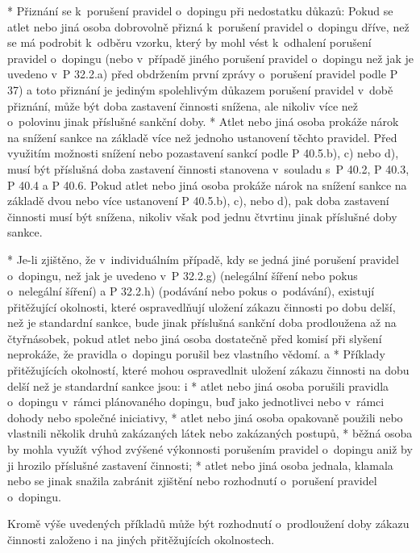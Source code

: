   * Přiznání se k~porušení pravidel o~dopingu při nedostatku důkazů: Pokud se atlet nebo jiná osoba dobrovolně přizná k~porušení pravidel o~dopingu dříve, než se má podrobit k~odběru vzorku, který by mohl vést k~odhalení porušení pravidel o~dopingu (nebo v~případě jiného porušení pravidel o~dopingu než jak je uvedeno v~P 32.2.a) před obdržením první zprávy o~porušení pravidel podle P 37) a toto přiznání je jediným spolehlivým důkazem porušení pravidel v~době přiznání, může být doba zastavení činnosti snížena, ale nikoliv více než o~polovinu jinak příslušné sankční doby.
  * Atlet nebo jiná osoba prokáže nárok na snížení sankce na základě více než jednoho ustanovení těchto pravidel. Před využitím možnosti snížení nebo pozastavení sankcí podle P 40.5.b), c) nebo d),  musí být příslušná doba zastavení činnosti stanovena v~souladu s~P 40.2, P 40.3, P 40.4 a P 40.6. Pokud atlet nebo jiná osoba prokáže nárok na snížení sankce na základě dvou nebo více ustanovení P 40.5.b), c), nebo d), pak doba zastavení činnosti musí být snížena, nikoliv však pod jednu čtvrtinu jinak příslušné doby sankce.
  \enditems

* Je-li zjištěno, že v~individuálním případě, kdy se jedná jiné porušení pravidel o~dopingu, než jak je uvedeno v~P 32.2.g) (nelegální šíření nebo pokus o~nelegální šíření) a P 32.2.h) (podávání nebo pokus o~podávání), existují přitěžující okolnosti, které ospravedlňují uložení zákazu činnosti po dobu delší, než je standardní sankce, bude jinak příslušná sankční doba prodloužena až na čtyřnásobek, pokud atlet nebo jiná osoba dostatečně před komisí při slyšení neprokáže, že pravidla o~dopingu porušil bez vlastního vědomí.
  \begitems \style a
  * Příklady přitěžujících okolností, které mohou ospravedlnit uložení zákazu činnosti na dobu delší než je standardní sankce jsou:
    \begitems \style i
    * atlet nebo jiná osoba porušili pravidla o~dopingu v~rámci plánovaného dopingu, buď jako jednotlivci nebo v~rámci dohody nebo společné iniciativy,
    * atlet nebo jiná osoba opakovaně použili nebo vlastnili několik druhů zakázaných látek nebo zakázaných postupů,
    * běžná osoba by mohla využít výhod zvýšené výkonnosti porušením pravidel o~dopingu aniž by ji hrozilo příslušné zastavení činnosti;
    * atlet nebo jiná osoba jednala, klamala nebo se jinak snažila zabránit zjištění nebo rozhodnutí o~porušení pravidel o~dopingu.
    \enditems

  Kromě výše uvedených příkladů může být rozhodnutí o~prodloužení doby zákazu činnosti založeno i na jiných přitěžujících okolnostech.

